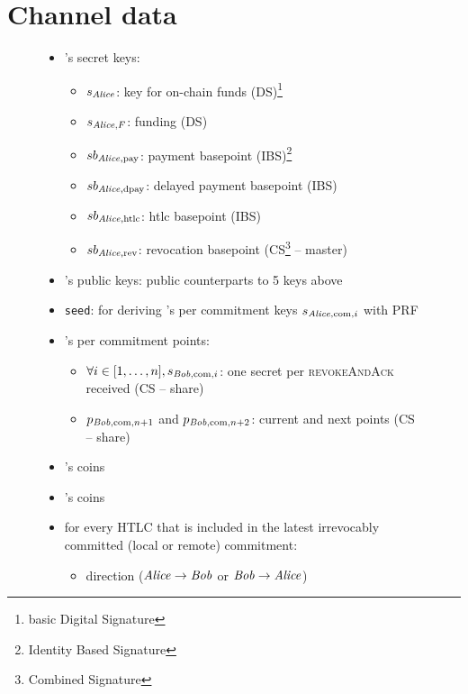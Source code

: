 \section{Channel data}

  \begin{figure}[H]
  \begin{mdframed}
    \begin{itemize}
      \item \alice's secret keys:
      \begin{itemize}
        \item $s_{\mathit{Alice}}$: key for on-chain funds (DS)\footnote{basic Digital
        Signature}
        \item $s_{\mathit{Alice}, F}$: funding (DS)
        \item $sb_{\mathit{Alice}, \mathrm{pay}}$: payment basepoint
        (IBS)\footnote{Identity Based Signature}
        \item $sb_{\mathit{Alice}, \mathrm{dpay}}$: delayed payment basepoint (IBS)
        \item $sb_{\mathit{Alice}, \mathrm{htlc}}$: htlc basepoint (IBS)
        \item $sb_{\mathit{Alice}, \mathrm{rev}}$: revocation basepoint
        (CS\footnote{Combined Signature} -- master)
      \end{itemize}
      \item \bob's public keys: public counterparts to 5 keys above
      \item \texttt{seed}: for deriving \alice's per commitment keys $s_{\mathit{Alice},
      \mathrm{com}, i}$ with PRF
      \item \bob's per commitment points:
      \begin{itemize}
        \item $\forall i \in [1, \dots, n], s_{\mathit{Bob}, \mathrm{com}, i}$: one
        secret per \textsc{revokeAndAck} received (CS -- share)
        \item $p_{\mathit{Bob}, \mathrm{com}, n+1}$ and $p_{\mathit{Bob}, \mathrm{com}, n+2}$:
        current and next points (CS -- share)
      \end{itemize}
      \item \alice's coins
      \item \bob's coins
      \item for every HTLC that is included in the latest irrevocably committed
      (local or remote) commitment:
        \begin{itemize}
          \item direction ($\mathit{Alice} \rightarrow \mathit{Bob}$ or $\mathit{Bob} \rightarrow \mathit{Alice}$)

\end{itemize}
\end{itemize}
\end{mdframed}
\end{figure}
